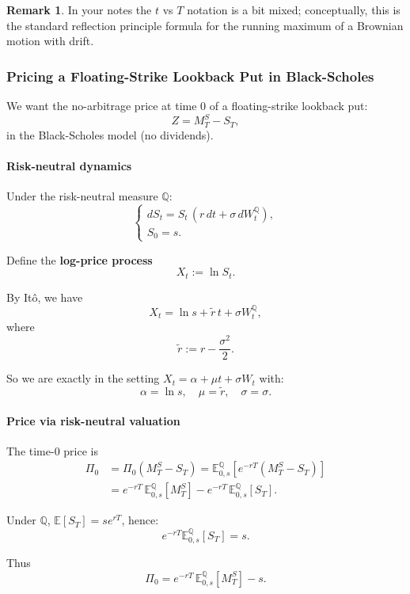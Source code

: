 \documentclass[12pt,a4paper]{article}
\theoremstyle{definition}
\newtheorem{remark}{Remark}[section]
\begin{document}
\begin{remark}
In your notes the $t$ vs $T$ notation is a bit mixed; conceptually, this is the standard reflection principle formula for the running maximum of a Brownian motion with drift.
\end{remark}

\subsubsection{Pricing a Floating-Strike Lookback Put in Black-Scholes}

We want the no-arbitrage price at time $0$ of a floating-strike lookback put:
\[
Z = M_T^S - S_T,
\]
in the Black-Scholes model (no dividends).

\paragraph{Risk-neutral dynamics}

Under the risk-neutral measure $\mathbb{Q}$:
\[
\begin{cases}
dS_t = S_t\, (r\, dt + \sigma\, dW_t^{\mathbb{Q}}), \\
S_0 = s.
\end{cases}
\]

Define the \textbf{log-price process}
\[
X_t := \ln S_t.
\]

By Itô, we have
\[
X_t = \ln s + \widetilde{r}\, t + \sigma W_t^{\mathbb{Q}},
\]
where
\[
\widetilde{r} := r - \frac{\sigma^2}{2}.
\]

So we are exactly in the setting $X_t = \alpha + \mu t + \sigma W_t$ with:
\[
\alpha = \ln s, \quad \mu = \widetilde{r}, \quad \sigma = \sigma.
\]

\paragraph{Price via risk-neutral valuation}

The time-0 price is
\[
\begin{aligned}
\Pi_0 &= \Pi_0(M_T^S - S_T) = \mathbb{E}_{0,s}^{\mathbb{Q}}\left[e^{-rT}(M_T^S - S_T)\right] \\
&= e^{-rT}\, \mathbb{E}_{0,s}^{\mathbb{Q}}[M_T^S] - e^{-rT}\, \mathbb{E}_{0,s}^{\mathbb{Q}}[S_T].
\end{aligned}
\]

Under $\mathbb{Q}$, $\mathbb{E}[S_T] = s e^{rT}$, hence:
\[
e^{-rT} \mathbb{E}_{0,s}^{\mathbb{Q}}[S_T] = s.
\]

Thus
\[
\Pi_0 = e^{-rT}\, \mathbb{E}_{0,s}^{\mathbb{Q}}[M_T^S] - s.
\]
\end{document}
